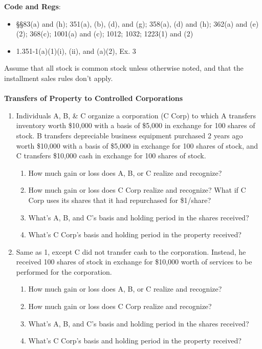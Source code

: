 \documentclass[12pt]{article}
\begin{document}
	\textbf{Code and Regs}: 
		\begin{itemize}
				\item
					\S\S 83(a) and (h); 351(a), (b), (d), and (g); 358(a), (d) and (h); 362(a) and (e)(2); 368(c); 1001(a) and (c); 1012; 1032; 1223(1) and (2) 
				\item
					1.351-1(a)(1)(i), (ii), and (a)(2), Ex. 3 \\
		\end{itemize}

Assume that all stock is common stock unless otherwise noted, and that the installment sales rules don't apply.
\\
\\
\textbf{Transfers of Property to Controlled Corporations}
\begin{enumerate}


	\item
		Individuals A, B, \& C organize a corporation (C Corp) to which A transfers inventory worth \$10,000 with a basis of \$5,000 in exchange for 100 shares of  stock. B transfers depreciable business equipment purchased 2 years ago worth \$10,000 with a basis of \$5,000 in exchange for 100 shares of  stock, and C transfers \$10,000 cash in exchange for 100 shares of  stock.  
			\begin{enumerate}
				\item How much gain or loss does A, B, or C realize and recognize?
				\item How much gain or loss does C Corp realize and recognize? What if C Corp uses its shares that it had repurchased for \$1/share?
				\item What's A, B, and C's basis and holding period in the shares received?
				\item What's C Corp's basis and holding period in the property received?
			\end{enumerate}


		\item Same as 1, except C did not transfer cash to the corporation. Instead, he received 100 shares of stock in exchange for \$10,000 worth of services to be performed for the corporation.
				\begin{enumerate}
							\item How much gain or loss does A, B, or C realize and recognize?
							\item How much gain or loss does C Corp realize and recognize? 
							\item What's A, B, and C's basis and holding period in the shares received?
							\item What's C Corp's basis and holding period in the property received?
						\end{enumerate}
						

\end{enumerate}
\end{document}
